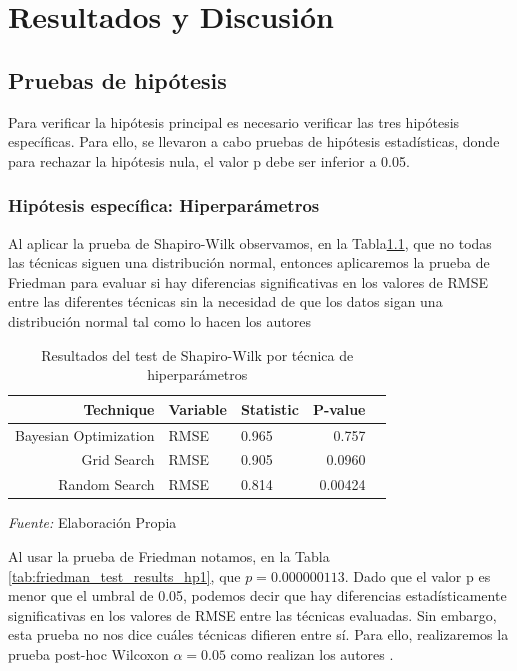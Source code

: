 
\doublespacing

\chapter{Resultados y Discusión}

\section{Pruebas de hipótesis}

Para verificar la hipótesis principal es necesario verificar las tres hipótesis específicas. Para ello, se llevaron a cabo pruebas de hipótesis estadísticas, donde para rechazar la hipótesis nula, el valor p debe ser inferior a 0.05.

\subsection{Hipótesis específica: Hiperparámetros}

Al aplicar la prueba de Shapiro-Wilk observamos, en la Tabla\ref{tab:shapiro_test_results_hp1}, que no todas las técnicas siguen una distribución normal, entonces aplicaremos la prueba de Friedman para  evaluar si hay diferencias significativas en los valores de RMSE entre las diferentes técnicas sin la necesidad de que los datos sigan una distribución normal tal como lo hacen los autores \cite{cleophas2016non}

\begin{table}[h]
\caption{Resultados del test de Shapiro-Wilk por técnica de hiperparámetros}
\centering
\begin{tabular}{rllrr}
\hline
Technique              & Variable & Statistic & P-value   \\ \hline
Bayesian Optimization  & RMSE     & 0.965     & 0.757     \\ 
Grid Search            & RMSE     & 0.905     & 0.0960    \\ 
Random Search          & RMSE     & 0.814     & 0.00424   \\ \hline
\end{tabular}
\label{tab:shapiro_test_results_hp1}
\end{table}
\small\textit{Fuente:} Elaboración Propia

Al usar la prueba de Friedman notamos, en la Tabla \ref{tab:friedman_test_results_hp1}, que $ p = 0.000000113 $. Dado que el valor p es  menor que el umbral de 0.05, podemos decir que hay diferencias estadísticamente significativas en los valores de RMSE entre las técnicas evaluadas. Sin embargo, esta prueba no nos dice cuáles técnicas difieren entre sí. Para ello, realizaremos la prueba post-hoc Wilcoxon \(\alpha = 0.05\) como realizan los autores \cite{julca2023cloud, hoque2021impact, li2017machine}.

